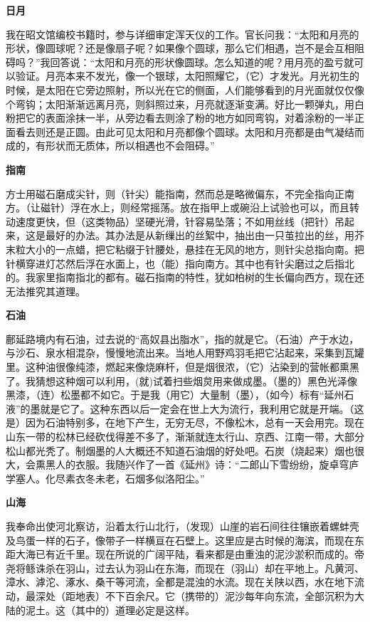 \documentclass[12pt,UTF-8,openany,a4]{ctexbook}
\begin{document}
\begin{large}
    \begin{center}{\Large\textbf{日月}}\end{center}
    
    我在昭文馆编校书籍时，参与详细审定浑天仪的工作。官长问我：“太阳和月亮的形状，像圆球呢？还是像扇子呢？如果像个圆球，那么它们相遇，岂不是会互相阻碍吗？”我回答说：“太阳和月亮的形状像圆球。怎么知道的呢？用月亮的盈亏就可以验证。月亮本来不发光，像一个银球，太阳照耀它，（它）才发光。月光初生的时候，是太阳在它旁边照射，所以光在它的侧面，人们能够看到的月光面就仅仅像个弯钩；太阳渐渐远离月亮，则斜照过来，月亮就逐渐变满。好比一颗弹丸，用白粉把它的表面涂抹一半，从旁边看去则涂了粉的地方如同弯钩，对着涂粉的一半正面看去则还是正圆。由此可见太阳和月亮都像个圆球。太阳和月亮都是由气凝结而成的，有形状而无质体，所以相遇也不会阻碍。”
    
    \begin{center}{\Large\textbf{指南}}\end{center}
    
    方士用磁石磨成尖针，则（针尖）能指南，然而总是略微偏东，不完全指向正南方。（让磁针）浮在水上，则经常摇荡。放在指甲上或碗沿上试验也可以，而且转动速度更快，但（这类物品）坚硬光滑，针容易坠落；不如用丝线（把针）吊起来，这是最好的办法。其办法是从新缫出的丝絮中，抽出由一只茧拉出的丝，用芥末粒大小的一点蜡，把它粘缀于针腰处，悬挂在无风的地方，则针尖总指向南。把针横穿进灯芯然后浮在水面上，也（能）指向南方。其中也有针尖磨过之后指北的。我家里指南指北的都有。磁石指南的特性，犹如柏树的生长偏向西方，现在还无法推究其道理。
    
    \begin{center}{\Large\textbf{石油}}\end{center}
    
    鄜延路境内有石油，过去说的“高奴县出脂水”，指的就是它。（石油）产于水边，与沙石、泉水相混杂，慢慢地流出来。当地人用野鸡羽毛把它沾起来，采集到瓦罐里。这种油很像纯漆，燃起来像烧麻杆，但是烟很浓，（它）沾染到的营帐都熏黑了。我猜想这种烟可以利用，(就)试着扫些烟炱用来做成墨。（墨的）黑色光泽像黑漆，（连）松墨都不如它。于是我（用它）大量制（墨），（如今）标有“延州石液”的墨就是它了。这种东西以后一定会在世上大为流行，我利用它就是开端。（这是）因为石油特别多，在地下产生，无穷无尽，不像松木，总有一天会用完。现在山东一带的松林已经砍伐得差不多了，渐渐就连太行山、京西、江南一带，大部分松山都光秃了。制烟墨的人大概还不知道石油烟的好处吧。石炭（烧起来）烟也很大，会熏黑人的衣服。我随兴作了一首《延州》诗：“二郎山下雪纷纷，旋卓穹庐学塞人。化尽素衣冬未老，石烟多似洛阳尘。”
    
    \begin{center}{\Large\textbf{山海}}\end{center}
    
    我奉命出使河北察访，沿着太行山北行，（发现）山崖的岩石间往往镶嵌着螺蚌壳及鸟蛋一样的石子，像带子一样横亘在石壁上。这里应是古时候的海滨，而现在东距大海已有近千里。现在所说的广阔平陆，看来都是由重浊的泥沙淤积而成的。帝尧将鲧诛杀在羽山，过去认为羽山在东海，而现在（羽山）却在平地上。凡黄河、漳水、滹沱、涿水、桑干等河流，全都是混浊的水流。现在关陕以西，水在地下流动，最深处（距地表）不下百余尺。它（携带的）泥沙每年向东流，全部沉积为大陆的泥土。这（其中的）道理必定是这样。
    
\end{large}
\end{document}
